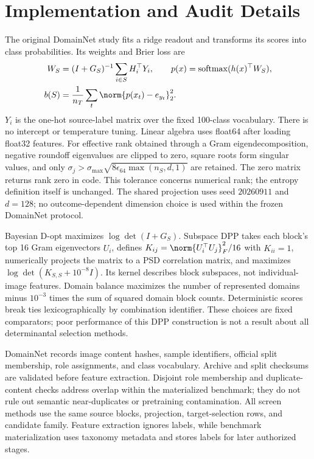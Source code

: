 \section{Implementation and Audit Details}
\label{app:protocol}
The original DomainNet study fits a ridge readout and transforms its scores into class probabilities. Its weights and Brier loss are
\begin{equation}
 \begin{aligned}
 W_S&=(I+G_S)^{-1}\sum_{i\in S}H_i^\top Y_i,\qquad
 p(x)=\operatorname{softmax}(h(x)^\top W_S),\\
 b(S)&=\frac1{n_T}\sum_t\norm{p(x_t)-e_{y_t}}_2^2.
 \end{aligned}
\end{equation}
$Y_i$ is the one-hot source-label matrix over the fixed 100-class vocabulary. There is no intercept or temperature tuning. Linear algebra uses float64 after loading float32 features. For effective rank obtained through a Gram eigendecomposition, negative roundoff eigenvalues are clipped to zero, square roots form singular values, and only $\sigma_j>\sigma_{\max}\sqrt{8\epsilon_{64}\max(n_S,d,1)}$ are retained. The zero matrix returns rank zero in code. This tolerance concerns numerical rank; the entropy definition itself is unchanged. The shared projection uses seed $20260911$ and $d=128$; no outcome-dependent dimension choice is used within the frozen DomainNet protocol.

Bayesian D-opt maximizes $\log\det(I+G_S)$. Subspace DPP takes each block's top 16 Gram eigenvectors $U_i$, defines $K_{ij}=\norm{U_i^\top U_j}_F^2/16$ with $K_{ii}=1$, numerically projects the matrix to a PSD correlation matrix, and maximizes $\log\det(K_{S,S}+10^{-8}I)$. Its kernel describes block subspaces, not individual-image features. Domain balance maximizes the number of represented domains minus $10^{-3}$ times the sum of squared domain block counts. Deterministic scores break ties lexicographically by combination identifier. These choices are fixed comparators; poor performance of this DPP construction is not a result about all determinantal selection methods.

DomainNet records image content hashes, sample identifiers, official split membership, role assignments, and class vocabulary. Archive and split checksums are validated before feature extraction. Disjoint role membership and duplicate-content checks address overlap within the materialized benchmark; they do not rule out semantic near-duplicates or pretraining contamination. All screen methods use the same source blocks, projection, target-selection rows, and candidate family. Feature extraction ignores labels, while benchmark materialization uses taxonomy metadata and stores labels for later authorized stages.

